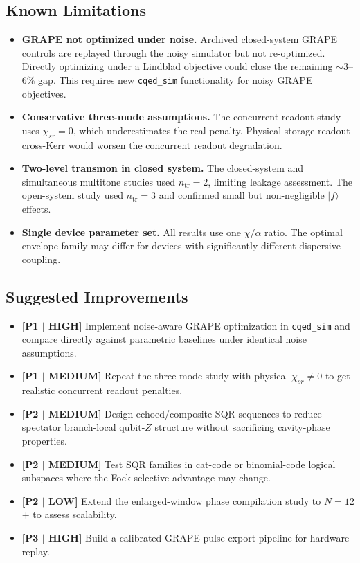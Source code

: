 \documentclass[aps,pra,twocolumn,reprint,amsmath,amssymb]{revtex4-2}
\begin{document}
\subsection{Known Limitations}
\begin{itemize}
\item \textbf{GRAPE not optimized under noise.} Archived closed-system GRAPE controls are replayed through the noisy simulator but not re-optimized. Directly optimizing under a Lindblad objective could close the remaining $\sim$3--6\% gap. This requires new \texttt{cqed\_sim} functionality for noisy GRAPE objectives.
\item \textbf{Conservative three-mode assumptions.} The concurrent readout study uses $\chi_{sr}=0$, which underestimates the real penalty. Physical storage-readout cross-Kerr would worsen the concurrent readout degradation.
\item \textbf{Two-level transmon in closed system.} The closed-system and simultaneous multitone studies used $n_\mathrm{tr}=2$, limiting leakage assessment. The open-system study used $n_\mathrm{tr}=3$ and confirmed small but non-negligible $|f\rangle$ effects.
\item \textbf{Single device parameter set.} All results use one $\chi/\alpha$ ratio. The optimal envelope family may differ for devices with significantly different dispersive coupling.
\end{itemize}

\subsection{Suggested Improvements}
\begin{itemize}
\item \textbf{[P1 $|$ HIGH]} Implement noise-aware GRAPE optimization in \texttt{cqed\_sim} and compare directly against parametric baselines under identical noise assumptions.
\item \textbf{[P1 $|$ MEDIUM]} Repeat the three-mode study with physical $\chi_{sr}\ne 0$ to get realistic concurrent readout penalties.
\item \textbf{[P2 $|$ MEDIUM]} Design echoed/composite SQR sequences to reduce spectator branch-local qubit-$Z$ structure without sacrificing cavity-phase properties.
\item \textbf{[P2 $|$ MEDIUM]} Test SQR families in cat-code or binomial-code logical subspaces where the Fock-selective advantage may change.
\item \textbf{[P2 $|$ LOW]} Extend the enlarged-window phase compilation study to $N=12$+ to assess scalability.
\item \textbf{[P3 $|$ HIGH]} Build a calibrated GRAPE pulse-export pipeline for hardware replay.
\end{itemize}
\end{document}
